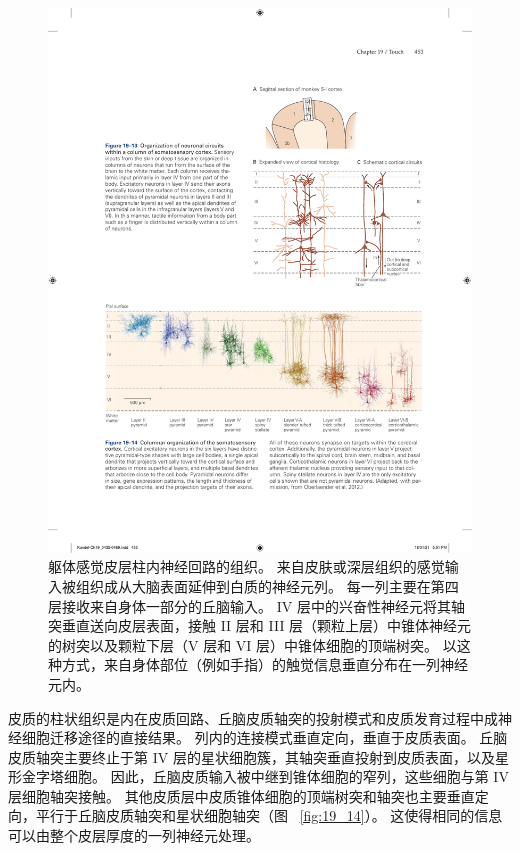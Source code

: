 \begin{figure}[htbp]
	\centering
	\includegraphics[width=0.5\linewidth]{chap19/fig_19_13}
	\caption{躯体感觉皮层柱内神经回路的组织。
		来自皮肤或深层组织的感觉输入被组织成从大脑表面延伸到白质的神经元列。
		每一列主要在第四层接收来自身体一部分的丘脑输入。
		IV 层中的兴奋性神经元将其轴突垂直送向皮层表面，接触 II 层和 III 层（颗粒上层）中锥体神经元的树突以及颗粒下层（V 层和 VI 层）中锥体细胞的顶端树突。
		以这种方式，来自身体部位（例如手指）的触觉信息垂直分布在一列神经元内。}
	\label{fig:19_13}
\end{figure}


皮质的柱状组织是内在皮质回路、丘脑皮质轴突的投射模式和皮质发育过程中成神经细胞迁移途径的直接结果。
列内的连接模式垂直定向，垂直于皮质表面。
丘脑皮质轴突主要终止于第 IV 层的星状细胞簇，其轴突垂直投射到皮质表面，以及星形金字塔细胞。
因此，丘脑皮质输入被中继到锥体细胞的窄列，这些细胞与第 IV 层细胞轴突接触。
其他皮质层中皮质锥体细胞的顶端树突和轴突也主要垂直定向，平行于丘脑皮质轴突和星状细胞轴突（图 ~\ref{fig:19_14}）。
这使得相同的信息可以由整个皮层厚度的一列神经元处理。


